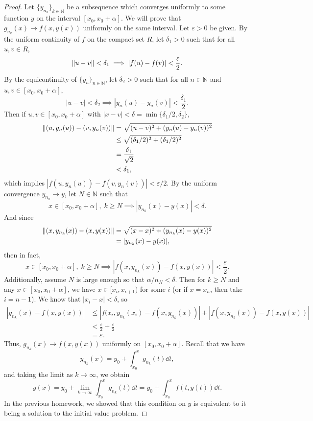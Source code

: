 \documentclass[12pt]{article}
\theoremstyle{definition}
\newcommand{\N}{\mathbb{N}}
\newcommand{\eps}{\varepsilon}
\begin{document}
\begin{proof}
    Let $\{y_{n_k}\}_{k \in \N}$ be a subsequence which converges uniformly to some function $y$ on the interval $[x_0, x_0 + \alpha]$. We will prove that $g_{n_k}(x) \to f(x, y(x))$ uniformly on the same interval. Let $\eps > 0$ be given. By the uniform continuity of $f$ on the compact set $R$, let $\delta_1 > 0$ such that for all $u, v \in R$,
    \[
        \norm{u - v} < \delta_1 \implies |f(u) - f(v)| < \frac{\eps}{2}.
    \]
    By the equicontinuity of $\{y_n\}_{n \in \N}$, let $\delta_2 > 0$ such that for all $n \in \N$ and $u, v \in [x_0, x_0 + \alpha]$,
    \[
        |u - v| < \delta_2 \implies |y_n(u) - y_n(v)| < \frac{\delta_1}{2}.
    \]
    Then if $u, v \in [x_0, x_0 + \alpha]$ with $|x - v| < \delta = \min\{\delta_1/2, \delta_2\}$,
    \begin{align*}
        \norm{(u, y_n(u)) - (v, y_n(v))}
            &= \sqrt{(u - v)^2 + (y_n(u) - y_n(v))^2} \\
            &\leq \sqrt{(\delta_1/2)^2 + (\delta_1/2)^2} \\
            &= \frac{\delta_1}{\sqrt{2}} \\
            &< \delta_1,
    \end{align*}
    which implies $|f(u, y_n(u)) - f(v, y_n(v))| < \eps/2$. By the uniform convergence $y_{n_k} \to y$, let $N \in \N$ such that
    \[
        x \in [x_0, x_0 + \alpha],\; k \geq N \implies |y_{n_k}(x) - y(x)| < \delta.
    \]
    And since
    \begin{align*}
        \norm{(x, y_{n_k}(x)) - (x, y(x))}
            &= \sqrt{(x - x)^2 + (y_{n_k}(x) - y(x))^2} \\
            &= |y_{n_k}(x) - y(x)|,
    \end{align*}
    then in fact,
    \[
        x \in [x_0, x_0 + \alpha],\; k \geq N \implies |f(x, y_{n_k}(x)) - f(x, y(x))| < \frac{\eps}{2}.
    \]
    Additionally, assume $N$ is large enough so that $\alpha/n_N < \delta$. Then for $k \geq N$ and any $x \in [x_0, x_0 + \alpha]$, we have $x \in [x_i, x_{i+1})$ for some $i$ (or if $x = x_n$, then take $i = n-1$). We know that $|x_i - x| < \delta$, so
    \begin{align*}
        |g_{n_k}(x) - f(x, y(x))|
            &\leq |f(x_i, y_{n_k}(x_i) - f(x, y_{n_k}(x))| + |f(x, y_{n_k}(x)) - f(x, y(x))| \\
            &< \frac{\eps}{2} + \frac{\eps}{2} \\
            &= \eps.
    \end{align*}
    Thus, $g_{n_k}(x) \to f(x, y(x))$ uniformly on $[x_0, x_0 + \alpha]$. Recall that we have
    \[
        y_{n_k}(x) = y_0 + \int_{x_0}^{x} g_{n_k}(t) \dd{t},
    \]
    and taking the limit as $k \to \infty$, we obtain
    \[
        y(x)
            = y_0 + \lim_{k \to \infty}\int_{x_0}^{x} g_{n_k}(t) \dd{t}
            = y_0 + \int_{x_0}^{x} f(t, y(t)) \dd{t}.
    \]
    In the previous homework, we showed that this condition on $y$ is equivalent to it being a solution to the initial value problem.
    
\end{proof}
\end{document}
